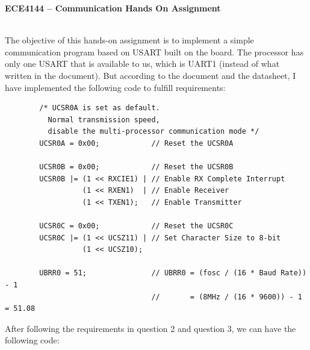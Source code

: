 \documentclass{article}
\begin{document}
\begin{minipage}{0.9\textwidth}
    \centering
    \Large
    \textbf{ECE4144 – Communication Hands On Assignment}
\end{minipage}\\[1em]
The objective of this hands-on assignment is to implement a simple communication program based on USART built on the board. The processor has only one USART that is available to us, which is UART1 (instead of what written in the document). But according to the document and the datasheet, I have implemented the following code to fulfill requirements:
\begin{verbatim}
        /* UCSR0A is set as default. 
          Normal transmission speed, 
          disable the multi-processor communication mode */
        UCSR0A = 0x00;            // Reset the UCSR0A

        UCSR0B = 0x00;            // Reset the UCSR0B
        UCSR0B |= (1 << RXCIE1) | // Enable RX Complete Interrupt
                  (1 << RXEN1)  | // Enable Receiver
                  (1 << TXEN1);   // Enable Transmitter

        UCSR0C = 0x00;            // Reset the UCSR0C
        UCSR0C |= (1 << UCSZ11) | // Set Character Size to 8-bit
                  (1 << UCSZ10);
                  
        UBRR0 = 51;               // UBRR0 = (fosc / (16 * Baud Rate)) - 1
                                  //       = (8MHz / (16 * 9600)) - 1 = 51.08
\end{verbatim}
After following the requirements in question 2 and question 3, we can have the following code:
\end{document}

